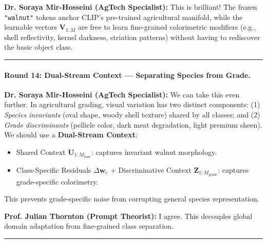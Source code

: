 \documentclass[letterpaper,11pt,leqno]{article}
\newcommand{\speakerThornton}[1]{\noindent\textbf{\color{blue!70!black}Prof. Julian Thornton (Prompt Theorist):} #1\vspace{0.4em}}
\newcommand{\speakerMirHosseini}[1]{\noindent\textbf{\color{orange!80!black}Dr. Soraya Mir-Hosseini (AgTech Specialist):} #1\vspace{0.4em}}
\begin{document}
\speakerMirHosseini{This is brilliant! The frozen \texttt{"walnut"} tokens anchor CLIP's pre-trained agricultural manifold, while the learnable vectors $\mathbf{V}_{1:M}$ are free to learn fine-grained colorimetric modifiers (e.g., shell reflectivity, kernel darkness, striation patterns) without having to rediscover the basic object class.}

\vspace{0.8em}\hrule\vspace{0.8em}

\paragraph{Round 14: Dual-Stream Context — Separating Species from Grade.}
\speakerMirHosseini{We can take this even further. In agricultural grading, visual variation has two distinct components: (1) \textit{Species invariants} (oval shape, woody shell texture) shared by all classes; and (2) \textit{Grade discriminants} (pellicle color, dark meat degradation, light premium sheen). We should use a \textbf{Dual-Stream Context}:
\begin{itemize}
    \item Shared Context $\mathbf{U}_{1:M_\mathrm{base}}$: captures invariant walnut morphology.
    \item Class-Specific Residuals $\Delta \mathbf{w}_c$ + Discriminative Context $\mathbf{Z}_{1:M_\mathrm{grade}}$: captures grade-specific colorimetry.
\end{itemize}
This prevents grade-specific noise from corrupting general species representation.}

\speakerThornton{I agree. This decouples global domain adaptation from fine-grained class separation.}

\vspace{0.8em}\hrule\vspace{0.8em}

\end{document}
